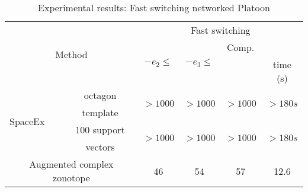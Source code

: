 \begin{table}
{\vspace{2em}
\begin{tabular}{|l|c|c|c|c|c|}
\hline
\multicolumn{2}{|c|}{\multirow{4}{*}{Method}} & \multicolumn{4}{|c|}{\multirow{2}{*}{Fast switching}}\\
\multicolumn{2}{|c|}{} & \multicolumn{4}{|c|}{}\\
\cline{3-6}
\multicolumn{2}{|c|}{} & \multirow{2}{*}{$-e_1\leq$} & \multirow{2}{*}{$-e_2\leq$} & \multirow{2}{*}{$-e_3\leq$} & Comp.\\
\multicolumn{2}{|c|}{} & & & & time (s)\\
\hline
\multirow{4}{*}{SpaceEx} & octagon & \multirow{2}{*}{$>1000$} &
\multirow{2}{*}{$>1000$} & \multirow{2}{*}{$>1000$} &
\multirow{2}{*}{$>180s$}\\
& template & & & &\\
\cline{2-6}
& 100 support & \multirow{2}{*}{$>1000$} & \multirow{2}{*}{$>1000$} &
\multirow{2}{*}{$>1000$} & \multirow{2}{*}{$>180s$}\\
& vectors & & & & \\
\hline
\multicolumn{2}{|c|}{\multirow{2}{*}{Augmented complex zonotope}} &
\multirow{2}{*}{46} & \multirow{2}{*}{54} &
\multirow{2}{*}{57} & \multirow{2}{*}{12.6}\\
\multicolumn{2}{|c|}{} & & & & \\
\hline
\end{tabular}
%
\caption{Experimental results: Fast switching networked Platoon}~\label{tab:largedwell-platoon1}
}
\end{table}
